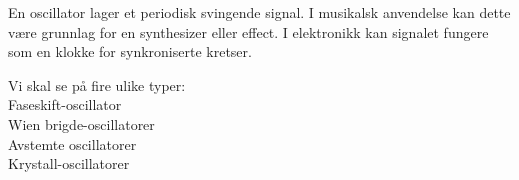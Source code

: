 En oscillator lager et periodisk svingende signal.
I musikalsk anvendelse kan dette være grunnlag for en synthesizer eller effect.
I elektronikk kan signalet fungere som en klokke for synkroniserte kretser.

Vi skal se på fire ulike typer: \\
Faseskift-oscillator \\
Wien brigde-oscillatorer \\
Avstemte oscillatorer \\
Krystall-oscillatorer
